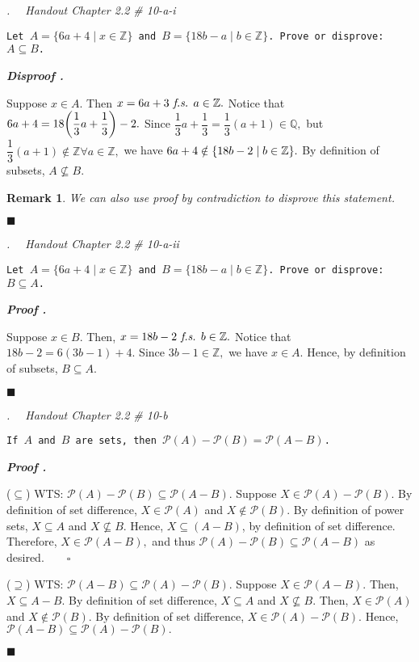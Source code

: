 \documentclass[11pt,letter]{article}
\newcounter{nq}[section]
\newcounter{np}[section]
\newtheorem*{rmk}{\indent Remark}
\newenvironment*{p}{\par\noindent\textbf{\textit{Proof \stepcounter{np}\thenp. }}\par}{\par\hfill $\blacksquare$\par}
\newenvironment*{dis}{\par\noindent\textbf{\textit{Disproof \stepcounter{np}\thenp. }}\par}{\par\hfill $\blacksquare$\par}
\newenvironment*{q}[1]{\noindent\emph{\thesection.\stepcounter{nq}\thenq$\quad $ #1}\par\noindent\texttt}{}
\def\Z{{\mathbb{Z}}}
\def\Q{{\mathbb{Q}}}
\def\pwer{{\mathcal{P}}}
\def\fs{\emph{ f.s. }}
\begin{document}
\begin{framed}\begin{q}
	{Handout Chapter 2.2 \# 10-a-i}
	{Let $A=\{6a+4\mid x\in\Z\}$ and $B=\{18b-a\mid b\in\Z\}$. Prove or disprove: $A\subseteq B$.}
\end{q}\end{framed}
\begin{dis}
	Suppose $x\in A$. Then $x=6a+3\fs a\in\Z.$ Notice that $6a+4=18\qty(\dfrac{1}{3}a+\dfrac{1}{3})-2.$ Since $\dfrac{1}{3}a+\dfrac{1}{3}=\dfrac{1}{3}(a+1)\in\Q,$ but $\dfrac{1}{3}(a+1)\notin\Z\forall a\in\Z,$ we have $6a+4\notin\qty{18b-2\mid b\in\Z}.$ By definition of subsets, $A\nsubseteq B.$
	\begin{rmk}
		We can also use proof by contradiction to disprove this statement.
	\end{rmk}
\end{dis}

\begin{framed}\begin{q}
	{Handout Chapter 2.2 \# 10-a-ii}
	{Let $A=\{6a+4\mid x\in\Z\}$ and $B=\{18b-a\mid b\in\Z\}$. Prove or disprove: $B\subseteq A$.}
\end{q}\end{framed}
\begin{p}
	Suppose $x\in B.$ Then, $x=18b-2\fs b\in\Z.$ Notice that $18b-2=6(3b-1)+4.$ Since $3b-1\in\Z,$ we have $x\in A.$ Hence, by definition of subsets, $B\subseteq A.$	
\end{p}

\begin{framed}\begin{q}
	{Handout Chapter 2.2 \# 10-b}
	{If $A$ and $B$ are sets, then $\pwer(A)-\pwer(B)=\pwer(A-B)$.}
\end{q}\end{framed}
\begin{p}
	($\subseteq$) WTS: $\pwer(A)-\pwer(B)\subseteq\pwer(A-B).$ Suppose $X\in\pwer(A)-\pwer(B).$ By definition of set difference, $X\in\pwer(A)$ and $X\notin\pwer(B).$ By definition of power sets, $X\subseteq A$ and $X\nsubseteq B.$ Hence, $X\subseteq(A-B)$, by definition of set difference. Therefore, $X\in\pwer(A-B),$ and thus $\pwer(A)-\pwer(B)\subseteq\pwer(A-B)$ as desired.$\qquad\square$\par 
	($\supseteq$) WTS: $\pwer(A-B)\subseteq\pwer(A)-\pwer(B).$ Suppose $X\in\pwer(A-B).$ Then, $X\subseteq A-B.$ By definition of set difference, $X\subseteq A$ and $X\nsubseteq B.$ Then, $X\in\pwer(A)$ and $X\notin\pwer(B).$ By definition of set difference, $X\in\pwer(A)-\pwer(B).$ Hence, $\pwer(A-B)\subseteq\pwer(A)-\pwer(B).$
\end{p}
\end{document}
